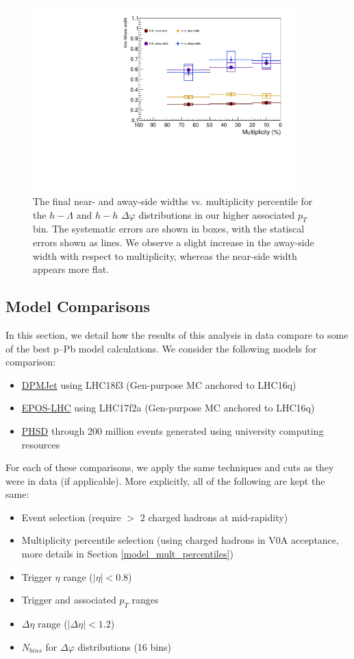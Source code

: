 \documentclass[ALICE,manyauthors]{ALICE_analysis_notes}
\begin{document}
\begin{figure}[ht]
\centering
\includegraphics[width=4in]{figures/von_mises_widths_highpt.pdf}
\caption{The final near- and away-side widths vs. multiplicity percentile for the $h-\Lambda$ and $h-h$ $\Delta\varphi$ distributions in our higher associated $p_{T}$ bin. The systematic errors are shown in boxes, with the statiscal errors shown as lines. We observe a slight increase in the away-side width with respect to multiplicity, whereas the near-side width appears more flat.}
\label{width_vs_mult_highpt}
\end{figure}
\clearpage

\subsection{Model Comparisons}
\label{model_comparisons}
In this section, we detail how the results of this analysis in data compare to some of the best p--Pb model calculations. We consider the following models for comparison:
\begin{itemize}
\item \href{https://arxiv.org/pdf/hep-ph/0012252.pdf}{DPMJet} using LHC18f3 (Gen-purpose MC anchored to LHC16q)
\item \href{https://arxiv.org/pdf/1306.0121.pdf}{EPOS-LHC} using LHC17f2a  (Gen-purpose MC anchored to LHC16q)
\item \href{https://arxiv.org/pdf/0808.0022.pdf}{PHSD} through 200 million events generated using university computing resources
\end{itemize}

For each of these comparisons, we apply the same techniques and cuts as they were in data (if applicable). More explicitly, all of the following are kept the same:
\begin{itemize}
\item Event selection (require $>$ 2 charged hadrons at mid-rapidity)
\item Multiplicity percentile selection (using charged hadrons in V0A acceptance, more details in Section \ref{model_mult_percentiles})
\item Trigger $\eta$ range ($|\eta| < 0.8$)
\item Trigger and associated $p_{T}$ ranges
\item $\Delta\eta$ range ($|\Delta\eta| < 1.2$)
\item $N_{bins}$ for $\Delta\varphi$ distributions (16 bins)
\end{itemize}
\end{document}
